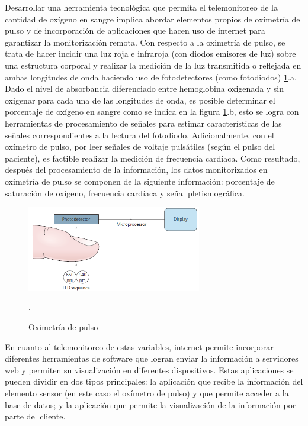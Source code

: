 \documentclass[journal]{IEEEtran}
\begin{document}
Desarrollar una herramienta tecnológica que permita el telemonitoreo de la cantidad de oxígeno en sangre implica abordar elementos propios de oximetría de pulso y de incorporación de aplicaciones que hacen uso de internet para garantizar la monitorización remota. Con respecto a la oximetría de pulso, se trata de hacer incidir una luz roja e infraroja (con diodos emisores de luz) sobre una estructura corporal y realizar la medición de la luz transmitida o reflejada en ambas longitudes de onda haciendo uso de fotodetectores (como fotodiodos) \ref{principio_funcionamiento}.a. Dado el nivel de absorbancia diferenciado entre hemoglobina oxigenada y sin oxigenar para cada una de las longitudes de onda, es posible determinar el porcentaje de oxígeno en sangre como se indica en la figura \ref{principio_funcionamiento}.b, esto se logra con herramientas de procesamiento de señales para estimar características de las señales correspondientes a la lectura del fotodiodo.  Adicionalmente, con el oxímetro de pulso, por leer señales de voltaje pulsátiles (según el pulso del paciente), es factible realizar la medición de frecuencia cardíaca. Como resultado, después del procesamiento de la información,  los datos monitorizados en oximetría de pulso se componen de la siguiente información: porcentaje de saturación de oxígeno, frecuencia cardíaca y señal pletismográfica.

\begin{figure}[!h]
	\centering
	\includegraphics[width=3in]{principio_funcionamiento.png}
	\caption{Oximetría de pulso }.
	\label{principio_funcionamiento}
\end{figure}


En cuanto al telemonitoreo de estas variables, internet permite incorporar diferentes herramientas de software que logran enviar la información a servidores web y permiten su visualización en diferentes dispositivos.  Estas aplicaciones se pueden dividir en dos tipos principales: la aplicación que recibe la información del elemento sensor (en este caso el oxímetro de pulso) y que permite acceder a la base de datos; y la aplicación que permite la visualización de la información por parte del cliente.
\end{document}

